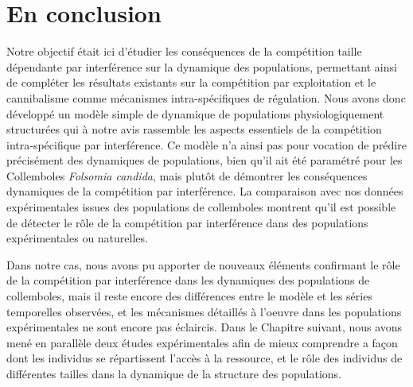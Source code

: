 \section{En conclusion}

Notre objectif était ici d'étudier les conséquences de la compétition taille
dépendante par interférence sur la dynamique des populations, permettant ainsi
de compléter les résultats existants sur la compétition par exploitation et le
cannibalisme comme mécanismes intra-spécifiques de régulation. Nous avons donc
développé un modèle simple de dynamique de populations physiologiquement
structurées qui à notre avis rassemble les aspects essentiels de la compétition
intra-spécifique par interférence. Ce modèle n'a ainsi pas pour vocation de
prédire précisément des dynamiques de populations, bien qu'il ait été paramétré
pour les Collemboles \textit{Folsomia candida}, mais plutôt de démontrer les
conséquences dynamiques de la compétition par interférence. La comparaison avec
nos données expérimentales issues des populations de collemboles montrent qu'il
est possible de détecter le rôle de la compétition par interférence dans des
populations expérimentales ou naturelles. 

Dans notre cas, nous avons pu apporter de nouveaux éléments confirmant le rôle
de la compétition par interférence dans les dynamiques des populations de
collemboles, mais il reste encore des différences entre le modèle et les séries
temporelles observées, et les mécanismes détaillés à l'oeuvre dans les
populations expérimentales ne sont encore pas éclaircis. Dans le Chapitre
suivant, nous avons mené en parallèle deux études expérimentales afin de mieux
comprendre a façon dont les individus se répartissent l'accès à la ressource, et
le rôle des individus de différentes tailles dans la dynamique de la structure
des populations.
